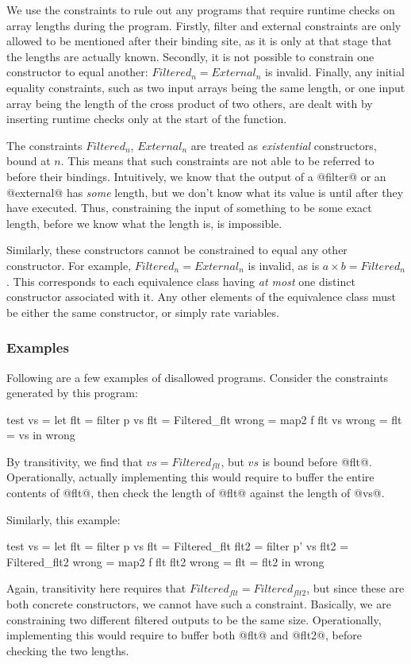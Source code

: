 We use the constraints to rule out any programs that require runtime checks on array lengths during the program.
Firstly, filter and external constraints are only allowed to be mentioned after their binding site, as it is only at that stage that the lengths are actually known.
Secondly, it is not possible to constrain one constructor to equal another: $Filtered_n = External_n$ is invalid.
Finally, any initial equality constraints, such as two input arrays being the same length, or one input array being the length of the cross product of two others, are dealt with by inserting runtime checks only at the start of the function.


The constraints $Filtered_n$, $External_n$ are treated as \emph{existential} constructors, bound at $n$.
This means that such constraints are not able to be referred to before their bindings.
Intuitively, we know that the output of a @filter@ or an @external@ has \emph{some} length, but we don't know what its value is until after they have executed.
Thus, constraining the input of something to be some exact length, before we know what the length is, is impossible.



Similarly, these constructors cannot be constrained to equal any other constructor. 
For example, $Filtered_n = External_n$ is invalid, as is $a \times b = Filtered_n$.
This corresponds to each equivalence class having \emph{at most} one distinct constructor associated with it.
Any other elements of the equivalence class must be either the same constructor, or simply rate variables.

\subsubsection{Examples}
Following are a few examples of disallowed programs.
Consider the constraints generated by this program:
\begin{code}
test vs    =
 let flt   = filter p vs        { flt   = Filtered_flt }
     wrong = map2   f flt vs    { wrong = flt = vs     }
 in  wrong
\end{code}
By transitivity, we find that $vs = Filtered_{flt}$, but $vs$ is bound before @flt@.
Operationally, actually implementing this would require to buffer the entire contents of @flt@, then check the length of @flt@ against the length of @vs@.


Similarly, this example:
\begin{code}
test vs    =
 let flt   = filter p  vs       { flt   = Filtered_flt  }
     flt2  = filter p' vs       { flt2  = Filtered_flt2 }
     wrong = map2   f  flt flt2 { wrong = flt = flt2    }
 in  wrong
\end{code}
Again, transitivity here requires that $Filtered_{flt} = Filtered_{flt2}$, but since these are both concrete constructors, we cannot have such a constraint.
Basically, we are constraining two different filtered outputs to be the same size.
Operationally, implementing this would require to buffer both @flt@ and @flt2@, before checking the two lengths.

